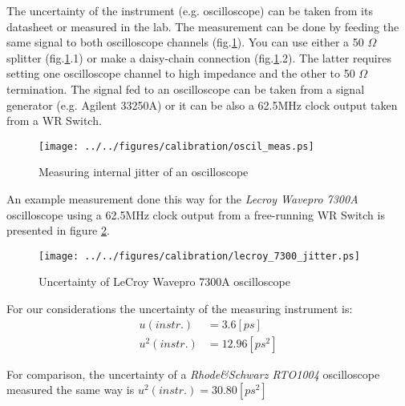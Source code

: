The uncertainty of the instrument (e.g. oscilloscope) can be taken from
its datasheet or measured in the lab. The measurement can be done by feeding
the same signal to both oscilloscope channels (fig.\ref{fig:errors:osc_jitter}).
You can use either a 50 $\Omega$ splitter (fig.\ref{fig:errors:osc_jitter}.1) or
make a daisy-chain connection (fig.\ref{fig:errors:osc_jitter}.2). The
latter requires setting one oscilloscope channel to high impedance and the
other to 50 $\Omega$ termination. The signal fed to an oscilloscope can be taken
from a signal generator (e.g. Agilent 33250A) or it can be also a 62.5MHz clock
output taken from a WR Switch.
\begin{figure}[ht]
	\begin{center}
	\texttt{[image: ../../figures/calibration/oscil\_meas.ps]}
	\caption{Measuring internal jitter of an oscilloscope}
	\label{fig:errors:osc_jitter}
	\end{center}
\end{figure}
An example measurement done this way for the \emph{Lecroy Wavepro 7300A}
oscilloscope using a 62.5MHz clock output from a free-running WR Switch is
presented in figure \ref{fig:errors:lecroy_jitter}.
\begin{figure}
	\begin{center}
	\texttt{[image: ../../figures/calibration/lecroy\_7300\_jitter.ps]}
	\caption{Uncertainty of LeCroy Wavepro 7300A oscilloscope}
	\label{fig:errors:lecroy_jitter}
	\end{center}
\end{figure}
For our considerations the uncertainty of the measuring instrument is:
\begin{align}
	u(instr.) &= 3.6 [ps]\\
	\label{equ:errors:ulecroy}
  u^2(instr.) &= 12.96 [ps^2]
\end{align}

\noindent For comparison, the uncertainty of a \emph{Rhode\&Schwarz RTO1004}
oscilloscope measured the same way is $u^2(instr.) = 30.80 [ps^2]$\\

